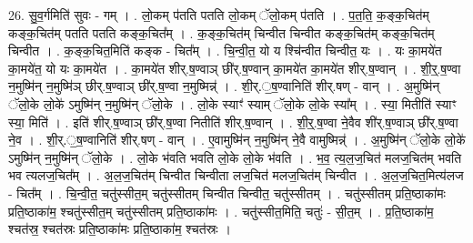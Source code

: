 \documentclass[17pt]{extarticle}
\begin{document}
26. सु॒व॒र्गमिति॑ सुवः - गम् । . लो॒कम् प॑तति पतति लो॒कम् ॅलो॒कम् प॑तति । . प॒त॒ति॒ क॒ङ्क॒चित॑म् कङ्क॒चित॑म् पतति पतति कङ्क॒चित᳚म् । . क॒ङ्क॒चित॑म् चिन्वीत चिन्वीत कङ्क॒चित॑म् कङ्क॒चित॑म् चिन्वीत । . क॒ङ्क॒चित॒मिति॑ कङ्क - चित᳚म् । . चि॒न्वी॒त॒ यो य श्चि॑न्वीत चिन्वीत॒ यः । . यः का॒मये॑त का॒मये॑त॒ यो यः का॒मये॑त । . का॒मये॑त शीर्.ष॒ण्वाञ् छी॑र्.ष॒ण्वान् का॒मये॑त का॒मये॑त शीर्.ष॒ण्वान् । . शी॒र्॒.ष॒ण्वा न॒मुष्मि॑न् न॒मुष्मि॑ञ् छीर्.ष॒ण्वाञ् छी॑र्.ष॒ण्वा न॒मुष्मिन्न्॑ । . शी॒र्.॒ष॒ण्वानिति॑ शीर्.षण् - वान् । . अ॒मुष्मि॑न् ॅलो॒के लो॒के॑ ऽमुष्मि॑न् न॒मुष्मि॑न् ॅलो॒के । . लो॒के स्याꣳ॑ स्याम् ॅलो॒के लो॒के स्या᳚म् । . स्या॒ मितीति॑ स्याꣳ स्या॒ मिति॑ । . इति॑ शीर्.ष॒ण्वाञ् छी॑र्.ष॒ण्वा नितीति॑ शीर्.ष॒ण्वान् । . शी॒र्॒.ष॒ण्वा ने॒वैव शी॑र्.ष॒ण्वाञ् छी॑र्.ष॒ण्वा ने॒व । . शी॒र्.॒ष॒ण्वानिति॑ शीर्.षण् - वान् । . ए॒वामुष्मि॑न् न॒मुष्मि॑न् ने॒वै वामुष्मिन्न्॑ । . अ॒मुष्मि॑न् ॅलो॒के लो॒के॑ ऽमुष्मि॑न् न॒मुष्मि॑न् ॅलो॒के । . लो॒के भ॑वति भवति लो॒के लो॒के भ॑वति । . भ॒व॒ त्य॒ल॒ज॒चित॑ मलज॒चित॑म् भवति भव त्यलज॒चित᳚म् । . अ॒ल॒ज॒चित॑म् चिन्वीत चिन्वीता लज॒चित॑ मलज॒चित॑म् चिन्वीत । . अ॒ल॒ज॒चित॒मित्य॑लज - चित᳚म् । . चि॒न्वी॒त॒ चतु॑स्सीत॒म् चतु॑स्सीतम् चिन्वीत चिन्वीत॒ चतु॑स्सीतम् । . चतु॑स्सीतम् प्रति॒ष्ठाका॑मः प्रति॒ष्ठाका॑म॒ श्चतु॑स्सीत॒म् चतु॑स्सीतम् प्रति॒ष्ठाका॑मः । . चतु॑स्सीत॒मिति॒ चतुः॑ - सी॒त॒म् । . प्र॒ति॒ष्ठाका॑म॒ श्चत॑स्र॒ श्चत॑स्रः प्रति॒ष्ठाका॑मः प्रति॒ष्ठाका॑म॒ श्चत॑स्रः । \newline
\end{document}
